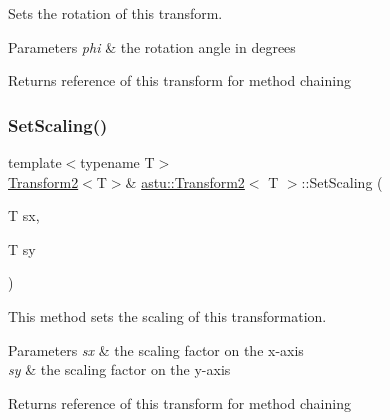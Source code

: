 Sets the rotation of this transform.


\begin{DoxyParams}{Parameters}
{\em phi} & the rotation angle in degrees \\
\hline
\end{DoxyParams}
\begin{DoxyReturn}{Returns}
reference of this transform for method chaining 
\end{DoxyReturn}
\mbox{\label{classastu_1_1Transform2_ab9c1a74b0111dd0fe1d98d05c494c6fa}} 
\subsubsection{\texorpdfstring{Set\+Scaling()}{SetScaling()}\hspace{0.1cm}{\footnotesize\ttfamily [1/2]}}
{\footnotesize\ttfamily template$<$typename T$>$ \\
\hyperlink{classastu_1_1Transform2}{Transform2}$<$T$>$\& \hyperlink{classastu_1_1Transform2}{astu\+::\+Transform2}$<$ T $>$\+::Set\+Scaling (\begin{DoxyParamCaption}\item[{T}]{sx,  }\item[{T}]{sy }\end{DoxyParamCaption})\hspace{0.3cm}{\ttfamily [inline]}}

This method sets the scaling of this transformation.


\begin{DoxyParams}{Parameters}
{\em sx} & the scaling factor on the x-\/axis \\
\hline
{\em sy} & the scaling factor on the y-\/axis \\
\hline
\end{DoxyParams}
\begin{DoxyReturn}{Returns}
reference of this transform for method chaining 
\end{DoxyReturn}
\mbox{\label{classastu_1_1Transform2_a39e88567ba54548929588d86bc42a37c}} 
